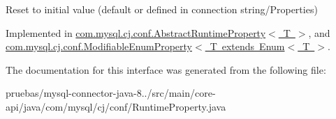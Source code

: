 Reset to initial value (default or defined in connection string/\+Properties) 

Implemented in \mbox{\hyperlink{classcom_1_1mysql_1_1cj_1_1conf_1_1_abstract_runtime_property_af8d93196b5571652a430ae751df642f9}{com.\+mysql.\+cj.\+conf.\+Abstract\+Runtime\+Property$<$ T $>$}}, and \mbox{\hyperlink{classcom_1_1mysql_1_1cj_1_1conf_1_1_modifiable_enum_property_a45be76d841ee45583b59419fa45526f6}{com.\+mysql.\+cj.\+conf.\+Modifiable\+Enum\+Property$<$ T extends Enum$<$ T $>$}}.



The documentation for this interface was generated from the following file\+:\begin{DoxyCompactItemize}
\item 
pruebas/mysql-\/connector-\/java-\/8../src/main/core-\/api/java/com/mysql/cj/conf/Runtime\+Property.\+java\end{DoxyCompactItemize}
